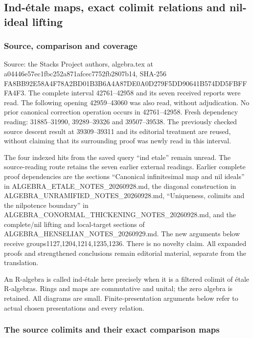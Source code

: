 \subsection{Ind-étale maps, exact colimit relations and nil-ideal lifting}\label{algebra-proof-059-ind-uxe9tale-maps-exact-colimit-relations-and-nil-ideal-lifting}

\subsubsection{Source, comparison and coverage}\label{algebra-proof-059-source-comparison-and-coverage}

Source: the Stacks Project authors, algebra.tex at a04446e57ec1fbc252a871afcec7752fb2807b14, SHA-256 FA8BB92E58A4F78A2BD01B3B6A4A87DE0A0D279F5DD90641B574DD5FBFFFA4F3. The complete interval 42761--42958 and its seven received reports were read. The following opening 42959--43060 was also read, without adjudication. No prior canonical correction operation occurs in 42761--42958. Fresh dependency reading: 31885--31990, 39289--39326 and 39507--39538. The previously checked source descent result at 39309--39311 and its editorial treatment are reused, without claiming that its surrounding proof was newly read in this interval.

The four indexed hits from the saved query ``ind etale'' remain unread. The source-reading route retains the seven earlier external readings. Earlier complete proof dependencies are the sections ``Canonical infinitesimal map and nil ideals'' in ALGEBRA\_ETALE\_NOTES\_20260928.md, the diagonal construction in ALGEBRA\_UNRAMIFIED\_NOTES\_20260928.md, ``Uniqueness, colimits and the nilpotence boundary'' in ALGEBRA\_CONORMAL\_THICKENING\_NOTES\_20260928.md, and the complete/nil lifting and local-target sections of ALGEBRA\_HENSELIAN\_NOTES\_20260929.md. The new arguments below receive groups1127,1204,1214,1235,1236. There is no novelty claim. All expanded proofs and strengthened conclusions remain editorial material, separate from the translation.

An R-algebra is called ind-étale here precisely when it is a filtered colimit of étale R-algebras. Rings and maps are commutative and unital; the zero algebra is retained. All diagrams are small. Finite-presentation arguments below refer to actual chosen presentations and every relation.

\subsubsection{The source colimits and their exact comparison maps}\label{algebra-proof-059-the-source-colimits-and-their-exact-comparison-maps}

